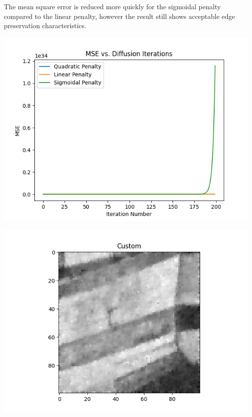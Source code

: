 \documentclass{article}
\begin{document}
  \noindent The mean square error is reduced more quickly for the sigmoidal penalty
  compared to the linear penalty, however the result still shows acceptable
  edge preservation characteristics.
  \begin{center}
    \includegraphics[scale=0.5]{../generated_images/MSE_test3.png}\\
  \end{center}
  \begin{center}
    \includegraphics[scale=0.5]{../generated_images/Custom_test3.png}\\
  \end{center}
\end{document}
